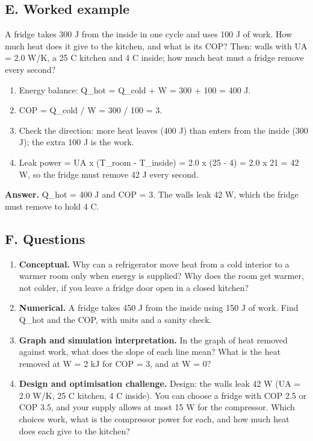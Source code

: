 \documentclass[11pt,a4paper]{article}
\begin{document}
\subsection*{E. Worked example}
A fridge takes 300 J from the inside in one cycle and uses 100 J of work. How much heat does it give to the kitchen, and what is its COP? Then: walls with UA = 2.0 W/K, a 25 C kitchen and 4 C inside; how much heat must a fridge remove every second?
\begin{enumerate}[nosep]
\item Energy balance: Q\_hot = Q\_cold + W = 300 + 100 = 400 J.
\item COP = Q\_cold / W = 300 / 100 = 3.
\item Check the direction: more heat leaves (400 J) than enters from the inside (300 J); the extra 100 J is the work.
\item Leak power = UA x (T\_room - T\_inside) = 2.0 x (25 - 4) = 2.0 x 21 = 42 W, so the fridge must remove 42 J every second.
\end{enumerate}
\textbf{Answer.} Q\_hot = 400 J and COP = 3. The walls leak 42 W, which the fridge must remove to hold 4 C.

\subsection*{F. Questions}
\begin{enumerate}[nosep]
\item \textbf{Conceptual.} Why can a refrigerator move heat from a cold interior to a warmer room only when energy is supplied? Why does the room get warmer, not colder, if you leave a fridge door open in a closed kitchen?
\item \textbf{Numerical.} A fridge takes 450 J from the inside using 150 J of work. Find Q\_hot and the COP, with units and a sanity check.
\item \textbf{Graph and simulation interpretation.} In the graph of heat removed against work, what does the slope of each line mean? What is the heat removed at W = 2 kJ for COP = 3, and at W = 0?
\item \textbf{Design and optimisation challenge.} Design: the walls leak 42 W (UA = 2.0 W/K, 25 C kitchen, 4 C inside). You can choose a fridge with COP 2.5 or COP 3.5, and your supply allows at most 15 W for the compressor. Which choices work, what is the compressor power for each, and how much heat does each give to the kitchen?
\end{enumerate}
\end{document}
